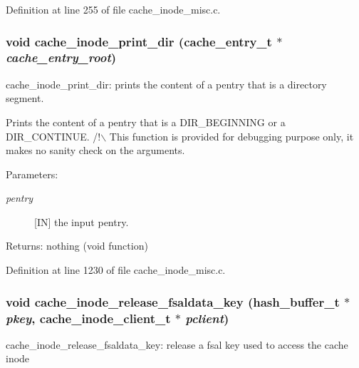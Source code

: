 Definition at line 255 of file cache\_\-inode\_\-misc.c.
\subsubsection[{cache\_\-inode\_\-print\_\-dir}]{\setlength{\rightskip}{0pt plus 5cm}void cache\_\-inode\_\-print\_\-dir (cache\_\-entry\_\-t $\ast$ {\em cache\_\-entry\_\-root})}\label{cache__inode__misc_8c_b405ebfdd83c07441a5f617862fd789a}


cache\_\-inode\_\-print\_\-dir: prints the content of a pentry that is a directory segment.

Prints the content of a pentry that is a DIR\_\-BEGINNING or a DIR\_\-CONTINUE. /!$\backslash$ This function is provided for debugging purpose only, it makes no sanity check on the arguments.

\begin{Desc}
\item[Parameters:]
\begin{description}
\item[{\em pentry}][IN] the input pentry.\end{description}
\end{Desc}
\begin{Desc}
\item[Returns:]nothing (void function) \end{Desc}


Definition at line 1230 of file cache\_\-inode\_\-misc.c.
\subsubsection[{cache\_\-inode\_\-release\_\-fsaldata\_\-key}]{\setlength{\rightskip}{0pt plus 5cm}void cache\_\-inode\_\-release\_\-fsaldata\_\-key (hash\_\-buffer\_\-t $\ast$ {\em pkey}, \/  cache\_\-inode\_\-client\_\-t $\ast$ {\em pclient})}\label{cache__inode__misc_8c_85615042ce506cf412216455b73ada68}


cache\_\-inode\_\-release\_\-fsaldata\_\-key: release a fsal key used to access the cache inode

